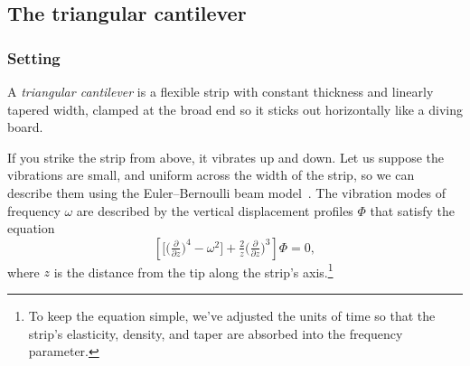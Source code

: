 \documentclass{article}
\theoremstyle{definition}
\theoremstyle{plain}
\begin{document}
\subsection{The triangular cantilever}\label{sec:catilever}
%
\subsubsection{Setting}
A {\em triangular cantilever} is a flexible strip with constant thickness and linearly tapered width, clamped at the broad end so it sticks out horizontally like a diving board.
\begin{center}
\end{center}
If you strike the strip from above, it vibrates up and down. Let us suppose the vibrations are small, and uniform across the width of the strip, so we can describe them using the Euler--Bernoulli beam model~\cite[\S 12.4]{genta2009vibration}. The vibration modes of frequency $\omega$ are described by the vertical displacement profiles $\Phi$ that satisfy the equation
\begin{equation}\label{eqn:triangular_cantilever}
    \left[\big[\big(\tfrac{\partial}{\partial z}\big)^4 - \omega^2\big] + \tfrac{2}{z}\big(\tfrac{\partial}{\partial z}\big)^3\right] \Phi = 0,
\end{equation}
where $z$ is the distance from the tip along the strip's axis.\footnote{To keep the equation simple, we've adjusted the units of time so that the strip's elasticity, density, and taper are absorbed into the frequency parameter.}
\end{document}
